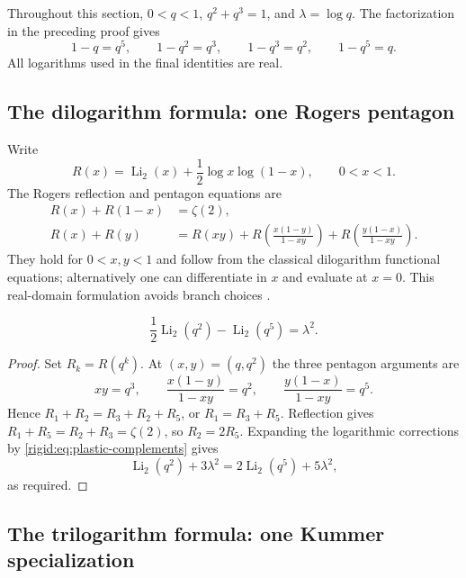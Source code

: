 Throughout this section, $0<q<1$, $q^2+q^3=1$, and
$\lambda=\log q$.  The factorization in the preceding proof gives
\begin{equation}
1-q=q^5,\qquad1-q^2=q^3,\qquad
1-q^3=q^2,\qquad1-q^5=q.
\label{rigid:eq:plastic-complements}
\end{equation}
All logarithms used in the final identities are real.

\subsection{The dilogarithm formula: one Rogers pentagon}

Write
\[
R(x)=\operatorname{Li}_2(x)+\frac12\log x\log(1-x),
\qquad 0<x<1.
\]
The Rogers reflection and pentagon equations are
\begin{align}
R(x)+R(1-x)&=\zeta(2),\label{rigid:eq:plastic-R-reflect}\\
R(x)+R(y)&=R(xy)
 +R\!\left(\frac{x(1-y)}{1-xy}\right)
 +R\!\left(\frac{y(1-x)}{1-xy}\right).
\label{rigid:eq:plastic-R-pentagon}
\end{align}
They hold for $0<x,y<1$ and follow from the classical dilogarithm
functional equations; alternatively one can differentiate in $x$
and evaluate at $x=0$.  This real-domain formulation avoids branch
choices \cite{gaussian:Zagier}.

\begin{theorem}
\label{rigid:thm:plastic-dilog}
\begin{equation}
\frac12\operatorname{Li}_2(q^2)-\operatorname{Li}_2(q^5)
=\lambda^2.
\label{rigid:eq:plastic-dilog-proved}
\end{equation}
\end{theorem}

\begin{proof}
Set $R_k=R(q^k)$.  At $(x,y)=(q,q^2)$ the three pentagon
arguments are
\[
xy=q^3,\qquad
\frac{x(1-y)}{1-xy}=q^2,\qquad
\frac{y(1-x)}{1-xy}=q^5.
\]
Hence $R_1+R_2=R_3+R_2+R_5$, or $R_1=R_3+R_5$.
Reflection gives $R_1+R_5=R_2+R_3=\zeta(2)$, so
$R_2=2R_5$.  Expanding the logarithmic corrections by
\eqref{rigid:eq:plastic-complements} gives
\[
\operatorname{Li}_2(q^2)+3\lambda^2
=2\operatorname{Li}_2(q^5)+5\lambda^2,
\]
as required.
\end{proof}

\subsection{The trilogarithm formula: one Kummer specialization}


